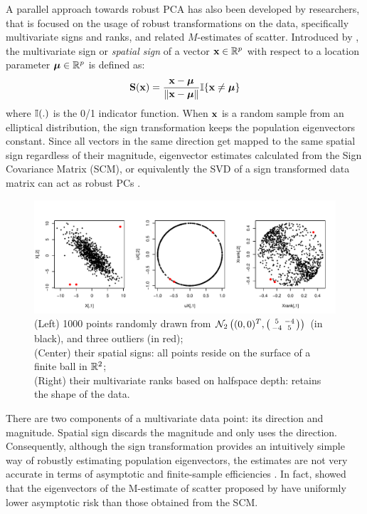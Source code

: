 A parallel approach towards robust PCA has also been developed by researchers, that is focused on the usage of robust transformations on the data, specifically multivariate signs and ranks, and related $M$-estimates of scatter. Introduced by \cite{MottonenOja95}, the multivariate sign or \textit{spatial sign} of a vector ${\bf{x}} \in {\mathbb{R}}^p$ with respect to a location parameter ${\boldsymbol{\mu}} \in {\mathbb{R}}^p$ is defined as:
%
$$
{\mathbf{S}} ({\bf{x}}) = \frac{{\bf{x}}  - {\boldsymbol{\mu}} }{\| {\bf{x}} - {\boldsymbol{\mu}}\|} {\mathbb{I}} \{ {\bf{x}} \neq {\boldsymbol{\mu}} \}
$$
%
where ${\mathbb{I}}(.)$ is the 0/1 indicator function. When ${\bf{x}}$ is a random sample from an elliptical distribution, the sign transformation keeps the population eigenvectors constant. Since all vectors in the same direction get mapped to the same spatial sign regardless of their magnitude, eigenvector estimates calculated from the Sign Covariance Matrix (SCM), or equivalently the SVD of a sign transformed data matrix can act as robust PCs \citep{LocantoreEtal99,visuri00}.

\begin{figure}[t]
\centering
\includegraphics[width=\textwidth]{allthree}
	\caption{(Left) 1000 points randomly drawn from $\mathcal N_2\left((0,0)^T, \left(\protect\begin{smallmatrix} 5 & -4 \\ -4 & 5 \protect\end{smallmatrix}\right)\right) $ (in black), and three outliers (in red);\\
(Center) their spatial signs: all points reside on the surface of a finite ball in ${\mathbb{R}}^2$;\\
(Right) their multivariate ranks based on halfspace depth: retains the shape of the data.}
	\label{fig1:allthree}
\end{figure}

There are two components of a multivariate data point: its direction and magnitude. Spatial sign discards the magnitude and only uses the direction. Consequently, although the sign transformation provides an intuitively simple way of robustly estimating population eigenvectors, the estimates are not very accurate in terms of asymptotic and finite-sample efficiencies \citep{Majumdar15}. In fact, \cite{magyar14} showed that the eigenvectors of the M-estimate of scatter proposed by \cite{tyler87} have uniformly lower asymptotic risk than those obtained from the SCM.

